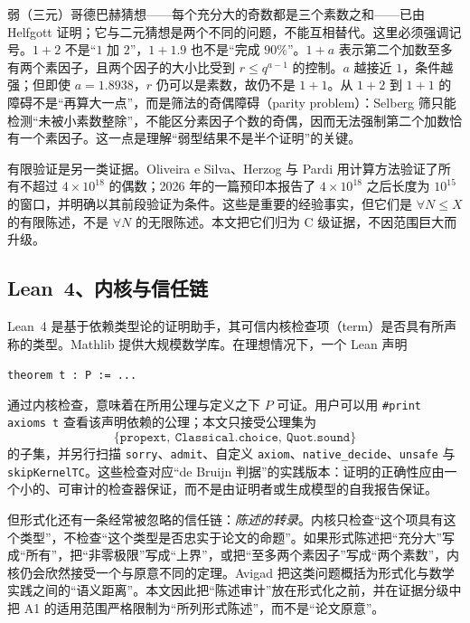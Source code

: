 \documentclass[11pt,a4paper]{ctexart}
\theoremstyle{plain}
\theoremstyle{definition}
\begin{document}
弱（三元）哥德巴赫猜想——每个充分大的奇数都是三个素数之和——已由 Helfgott 证明\cite{helfgott}；它与二元猜想是两个不同的问题，不能互相替代。这里必须强调记号。$1+2$ 不是“$1$ 加 $2$”，$1+1.9$ 也不是“完成 $90\%$”。$1+a$ 表示第二个加数至多有两个素因子，且两个因子的大小比受到 $r\le q^{a-1}$ 的控制。$a$ 越接近 $1$，条件越强；但即使 $a=1.8938$，$r$ 仍可以是素数，故仍不是 $1+1$。从 $1+2$ 到 $1+1$ 的障碍不是“再算大一点”，而是筛法的奇偶障碍（parity problem）：Selberg 筛只能检测“未被小素数整除”，不能区分素因子个数的奇偶，因而无法强制第二个加数恰有一个素因子\cite{montgomery-vaughan}。这一点是理解“弱型结果不是半个证明”的关键。

有限验证是另一类证据。Oliveira e Silva、Herzog 与 Pardi 用计算方法验证了所有不超过 $4\times10^{18}$ 的偶数\cite{oliveira2014}；2026 年的一篇预印本报告了 $4\times10^{18}$ 之后长度为 $10^{15}$ 的窗口，并明确以其前段验证为条件\cite{llorente2026}。这些是重要的经验事实，但它们是 $\forall N\le X$ 的有限陈述，不是 $\forall N$ 的无限陈述。本文把它们归为 C 级证据，不因范围巨大而升级。

\subsection{Lean~4、内核与信任链}
\label{sec:lean}

Lean~4 是基于依赖类型论的证明助手，其可信内核检查项（term）是否具有所声称的类型\cite{lean4}。Mathlib 提供大规模数学库\cite{mathlib}。在理想情况下，一个 Lean 声明
\begin{center}
\texttt{theorem t : P := ...}
\end{center}
通过内核检查，意味着在所用公理与定义之下 $P$ 可证。用户可以用 \texttt{\#print axioms t} 查看该声明依赖的公理；本文只接受公理集为
\[
\{\texttt{propext},\ \texttt{Classical.choice},\ \texttt{Quot.sound}\}
\]
的子集，并另行扫描 \texttt{sorry}、\texttt{admit}、自定义 \texttt{axiom}、\texttt{native\_decide}、\texttt{unsafe} 与 \texttt{skipKernelTC}。这些检查对应“de Bruijn 判据”的实践版本：证明的正确性应由一个小的、可审计的检查器保证，而不是由证明者或生成模型的自我报告保证\cite{geuvers2009}。

但形式化还有一条经常被忽略的信任链：\emph{陈述的转录}。内核只检查“这个项具有这个类型”，不检查“这个类型是否忠实于论文的命题”。如果形式陈述把“充分大”写成“所有”，把“非零极限”写成“上界”，或把“至多两个素因子”写成“两个素数”，内核仍会欣然接受一个与原意不同的定理。Avigad 把这类问题概括为形式化与数学实践之间的“语义距离”\cite{avigad2018}。本文因此把“陈述审计”放在形式化之前，并在证据分级中把 A1 的适用范围严格限制为“所列形式陈述”，而不是“论文原意”。
\end{document}
